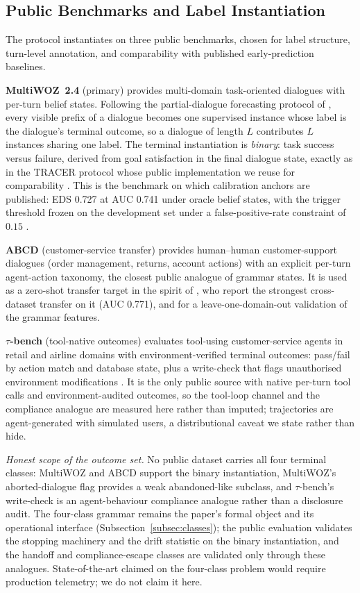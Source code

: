 \subsection{Public Benchmarks and Label Instantiation}
\label{subsec:datasets}
The protocol instantiates on three public benchmarks, chosen for label structure, turn-level annotation, and comparability with published early-prediction baselines.

\textbf{MultiWOZ~2.4} (primary) provides multi-domain task-oriented dialogues with per-turn belief states.
Following the partial-dialogue forecasting protocol of \citet{nourbakhsh2026tracer}, every visible prefix of a dialogue becomes one supervised instance whose label is the dialogue's terminal outcome, so a dialogue of length $L$ contributes $L$ instances sharing one label.
The terminal instantiation is \emph{binary}: task success versus failure, derived from goal satisfaction in the final dialogue state, exactly as in the TRACER protocol whose public implementation we reuse for comparability \citep{nourbakhsh2026tracer}.
This is the benchmark on which calibration anchors are published: EDS 0.727 at AUC 0.741 under oracle belief states, with the trigger threshold frozen on the development set under a false-positive-rate constraint of $0.15$ \citep{nourbakhsh2026tracer}.

\textbf{ABCD} (customer-service transfer) provides human--human customer-support dialogues (order management, returns, account actions) with an explicit per-turn agent-action taxonomy, the closest public analogue of grammar states.
It is used as a zero-shot transfer target in the spirit of \citet{nourbakhsh2026tracer}, who report the strongest cross-dataset transfer on it (AUC 0.771), and for a leave-one-domain-out validation of the grammar features.

\textbf{$\tau$-bench} (tool-native outcomes) evaluates tool-using customer-service agents in retail and airline domains with environment-verified terminal outcomes: pass/fail by action match and database state, plus a write-check that flags unauthorised environment modifications \citep{sierra2024taubench}.
It is the only public source with native per-turn tool calls and environment-audited outcomes, so the tool-loop channel and the compliance analogue are measured here rather than imputed; trajectories are agent-generated with simulated users, a distributional caveat we state rather than hide.

\emph{Honest scope of the outcome set.}
No public dataset carries all four terminal classes: MultiWOZ and ABCD support the binary instantiation, MultiWOZ's aborted-dialogue flag provides a weak abandoned-like subclass, and $\tau$-bench's write-check is an agent-behaviour compliance analogue rather than a disclosure audit.
The four-class grammar remains the paper's formal object and its operational interface (Subsection~\ref{subsec:classes}); the public evaluation validates the stopping machinery and the drift statistic on the binary instantiation, and the handoff and compliance-escape classes are validated only through these analogues.
State-of-the-art claimed on the four-class problem would require production telemetry; we do not claim it here.

